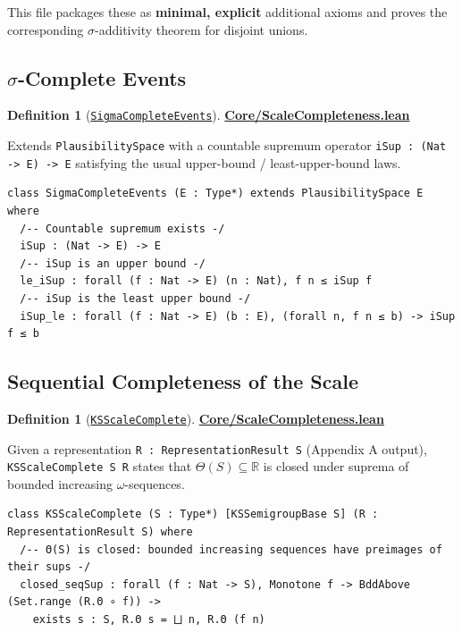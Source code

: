 \documentclass[11pt]{article}
\theoremstyle{definition}
\newtheorem{definition}[theorem]{Definition}
\theoremstyle{remark}
\begin{document}
This file packages these as \textbf{minimal, explicit} additional axioms and proves the corresponding
$\sigma$-additivity theorem for disjoint unions.

\subsection{$\sigma$-Complete Events}

\begin{definition}[\href{https://github.com/zariuq/ks-foundations-of-inference/blob/main/KnuthSkilling/Core/ScaleCompleteness.lean}{\texttt{SigmaCompleteEvents}}]
\textbf{\href{https://github.com/zariuq/ks-foundations-of-inference/blob/main/KnuthSkilling/Core/ScaleCompleteness.lean}{Core/ScaleCompleteness.lean}}

Extends \texttt{PlausibilitySpace} with a countable supremum operator \texttt{iSup : (Nat -> E) -> E}
satisfying the usual upper-bound / least-upper-bound laws.
\end{definition}

\begin{lstlisting}[caption={$\sigma$-complete events structure}]
class SigmaCompleteEvents (E : Type*) extends PlausibilitySpace E where
  /-- Countable supremum exists -/
  iSup : (Nat -> E) -> E
  /-- iSup is an upper bound -/
  le_iSup : forall (f : Nat -> E) (n : Nat), f n ≤ iSup f
  /-- iSup is the least upper bound -/
  iSup_le : forall (f : Nat -> E) (b : E), (forall n, f n ≤ b) -> iSup f ≤ b
\end{lstlisting}

\subsection{Sequential Completeness of the Scale}

\begin{definition}[\href{https://github.com/zariuq/ks-foundations-of-inference/blob/main/KnuthSkilling/Core/ScaleCompleteness.lean}{\texttt{KSScaleComplete}}]
\textbf{\href{https://github.com/zariuq/ks-foundations-of-inference/blob/main/KnuthSkilling/Core/ScaleCompleteness.lean}{Core/ScaleCompleteness.lean}}

Given a representation \texttt{R : RepresentationResult S} (Appendix A output), \texttt{KSScaleComplete S R}
states that $\Theta(S) \subseteq \mathbb{R}$ is closed under suprema of bounded increasing $\omega$-sequences.
\end{definition}

\begin{lstlisting}[caption={Scale completeness (sequential closure)}]
class KSScaleComplete (S : Type*) [KSSemigroupBase S] (R : RepresentationResult S) where
  /-- Θ(S) is closed: bounded increasing sequences have preimages of their sups -/
  closed_seqSup : forall (f : Nat -> S), Monotone f -> BddAbove (Set.range (R.Θ ∘ f)) ->
    exists s : S, R.Θ s = ⨆ n, R.Θ (f n)
\end{lstlisting}
\end{document}
